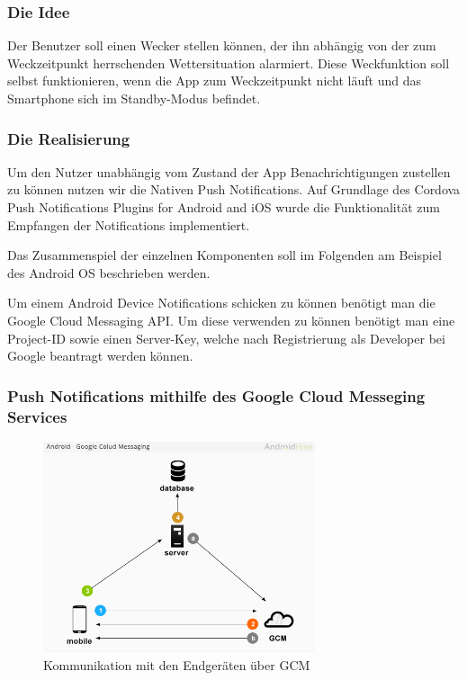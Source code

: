 \documentclass{report}
\begin{document}
\subsubsection{Die Idee}
Der Benutzer soll einen Wecker stellen können, der ihn abhängig von der zum Weckzeitpunkt herrschenden Wettersituation alarmiert.
Diese Weckfunktion soll selbst funktionieren, wenn die App zum Weckzeitpunkt nicht läuft und das Smartphone sich im Standby-Modus befindet.

\subsubsection{Die Realisierung}
Um den Nutzer unabhängig vom Zustand der App Benachrichtigungen zustellen zu können nutzen wir die Nativen Push Notifications.
Auf Grundlage des Cordova Push Notifications Plugins for Android and iOS \cite{cordova-pp}
wurde die Funktionalität zum Empfangen der Notifications implementiert.

Das Zusammenspiel der einzelnen Komponenten soll im Folgenden am Beispiel des Android OS beschrieben werden.

Um einem Android Device Notifications schicken zu können benötigt man die Google Cloud Messaging API.
Um diese verwenden zu können benötigt man eine Project-ID sowie einen Server-Key, welche nach Registrierung als Developer bei Google beantragt werden können.
\subsubsection{Push Notifications mithilfe des Google Cloud Messeging Services}
\begin{figure}[!h]
    \centerline{
        \includegraphics[width=8cm]{Bilder/gcm-a-modr.png}
    }
    \caption{Kommunikation mit den Endgeräten über GCM \cite{gcm-architecture}}
    \label{gcm-architecture}
\end{figure}
\end{document}
